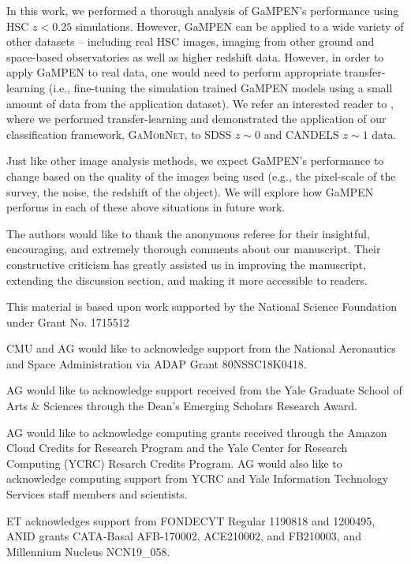 \documentclass[twocolumn]{aastex63}
\newcommand\gamornet{G\textsc{a}M\textsc{or}N\textsc{et}}
\newcommand\gampen{GaMPEN}
\begin{document}
\begin{CJK*}{UTF8}{gbsn}
In this work, we performed a thorough analysis of \gampen{}'s performance using HSC $z < 0.25$ simulations. However, \gampen{} can be applied to a wide variety of other datasets -- including real HSC images, imaging from other ground and space-based observatories as well as higher redshift data. However, in order to apply \gampen{} to real data, one would need to perform appropriate transfer-learning (i.e., fine-tuning the simulation trained \gampen{} models using a small amount of data from the application dataset). We refer an interested reader to \citet{Ghosh2020GalaxyGalaxies}, where we performed transfer-learning and demonstrated the application of our classification framework, \gamornet{}, to SDSS $z\sim0$ and CANDELS $z\sim1$ data.
    
Just like other image analysis methods, we expect \gampen{}'s performance to change based on the quality of the images being used (e.g., the pixel-scale of the survey, the noise, the redshift of the object). We will explore how \gampen{} performs in each of these above situations in future work.

\acknowledgments

The authors would like to thank the anonymous referee for their insightful, encouraging, and extremely thorough comments about our manuscript.  Their constructive criticism has greatly assisted us in improving the manuscript, extending the discussion section, and making it more accessible to readers.

This material is based upon work supported by the National Science Foundation under Grant No. 1715512

CMU and AG would like to acknowledge support from the National Aeronautics and Space Administration via ADAP Grant 80NSSC18K0418. 

AG would like to acknowledge support received from the Yale Graduate School of Arts \& Sciences through the Dean's Emerging Scholars Research Award.

AG would like to acknowledge computing grants received through the Amazon Cloud Credits for Research Program and the Yale Center for Research Computing (YCRC) Resarch Credits Program. AG would also like to acknowledge computing support from YCRC and Yale Information Technology Services staff members and scientists. 

ET acknowledges support from FONDECYT Regular 1190818 and 1200495, ANID grants CATA-Basal AFB-170002, ACE210002, and FB210003, and Millennium Nucleus NCN19\_058.


\end{CJK*}
\end{document}
